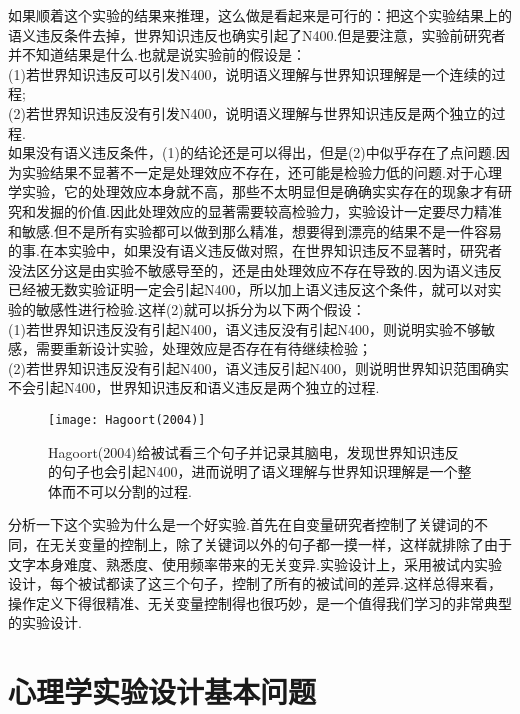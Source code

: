 \begin{kaobox}[frametitle=问题：如果这个实验只保留世界知识违反和正常条件，可行吗？]
如果顺着这个实验的结果来推理，这么做是看起来是可行的：把这个实验结果上的语义违反条件去掉，世界知识违反也确实引起了N400.但是要注意，实验前研究者并不知道结果是什么.也就是说实验前的假设是：\\
(1)若世界知识违反可以引发N400，说明语义理解与世界知识理解是一个连续的过程;\\
(2)若世界知识违反没有引发N400，说明语义理解与世界知识违反是两个独立的过程.\\
如果没有语义违反条件，(1)的结论还是可以得出，但是(2)中似乎存在了点问题.因为实验结果不显著不一定是处理效应不存在，还可能是检验力低的问题.对于心理学实验，它的处理效应本身就不高，那些不太明显但是确确实实存在的现象才有研究和发掘的价值.因此处理效应的显著需要较高检验力，实验设计一定要尽力精准和敏感.但不是所有实验都可以做到那么精准，想要得到漂亮的结果不是一件容易的事.在本实验中，如果没有语义违反做对照，在世界知识违反不显著时，研究者没法区分这是由实验不敏感导至的，还是由处理效应不存在导致的.因为语义违反已经被无数实验证明一定会引起N400，所以加上语义违反这个条件，就可以对实验的敏感性进行检验.这样(2)就可以拆分为以下两个假设：\\
(1)若世界知识违反没有引起N400，语义违反没有引起N400，则说明实验不够敏感，需要重新设计实验，处理效应是否存在有待继续检验；\\
(2)若世界知识违反没有引起N400，语义违反引起N400，则说明世界知识范围确实不会引起N400，世界知识违反和语义违反是两个独立的过程.
\end{kaobox}

\begin{figure}
    \texttt{[image: Hagoort(2004)]}
    \caption[Hagoort(2004)]{Hagoort(2004)给被试看三个句子并记录其脑电，发现世界知识违反的句子也会引起N400，进而说明了语义理解与世界知识理解是一个整体而不可以分割的过程.}
\end{figure}

分析一下这个实验为什么是一个好实验.首先在自变量研究者控制了关键词的不同，在无关变量的控制上，除了关键词以外的句子都一摸一样，这样就排除了由于文字本身难度、熟悉度、使用频率带来的无关变异.实验设计上，采用被试内实验设计，每个被试都读了这三个句子，控制了所有的被试间的差异.这样总得来看，操作定义下得很精准、无关变量控制得也很巧妙，是一个值得我们学习的非常典型的实验设计.

\section{心理学实验设计基本问题}

